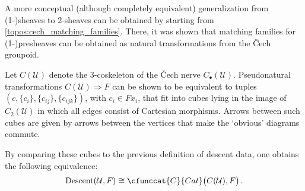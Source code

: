     
        A more conceptual (although completely equivalent) generalization from (1-)sheaves to 2-sheaves can be obtained by starting from \cref{topos:cech_matching_families}. There, it was shown that matching families for (1-)presheaves can be obtained as natural transformations from the \v{C}ech groupoid.
        \begin{property}
            Let $C(\mathcal{U})$ denote the 3-coskeleton of the \v{C}ech nerve $C_\bullet(\mathcal{U})$. Pseudonatural transformations $C(\mathcal{U})\Rightarrow F$ can be shown to be equivalent to tuples $(c,\{c_i\},\{c_{ij}\},\{c_{ijk}\})$, with $c_i\in Fx_i$, that fit into cubes lying in the image of $C_2(\mathcal{U})$ in which all edges consist of Cartesian morphisms. Arrows between such cubes are given by arrows between the vertices that make the `obvious' diagrams commute.
    
            By comparing these cubes to the previous definition of descent data, one obtains the following equivalence:
            \begin{gather}
                \mathrm{Descent}(\mathcal{U},F)\cong\cfunccat{C}{Cat}\bigl(C(\mathcal{U}),F\bigr)\,.
            \end{gather}
        \end{property}
    

